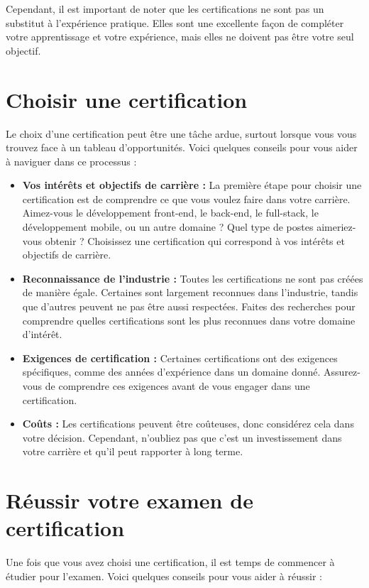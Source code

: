 Cependant, il est important de noter que les certifications ne sont pas un substitut à l'expérience pratique. Elles sont une excellente façon de compléter votre apprentissage et votre expérience, mais elles ne doivent pas être votre seul objectif.

\section{Choisir une certification}

Le choix d'une certification peut être une tâche ardue, surtout lorsque vous vous trouvez face à un tableau d'opportunités. Voici quelques conseils pour vous aider à naviguer dans ce processus :

\begin{itemize}
    \item \textbf{Vos intérêts et objectifs de carrière :} La première étape pour choisir une certification est de comprendre ce que vous voulez faire dans votre carrière. Aimez-vous le développement front-end, le back-end, le full-stack, le développement mobile, ou un autre domaine ? Quel type de postes aimeriez-vous obtenir ? Choisissez une certification qui correspond à vos intérêts et objectifs de carrière.
    \item \textbf{Reconnaissance de l'industrie :} Toutes les certifications ne sont pas créées de manière égale. Certaines sont largement reconnues dans l'industrie, tandis que d'autres peuvent ne pas être aussi respectées. Faites des recherches pour comprendre quelles certifications sont les plus reconnues dans votre domaine d'intérêt.
    \item \textbf{Exigences de certification :} Certaines certifications ont des exigences spécifiques, comme des années d'expérience dans un domaine donné. Assurez-vous de comprendre ces exigences avant de vous engager dans une certification.
    \item \textbf{Coûts :} Les certifications peuvent être coûteuses, donc considérez cela dans votre décision. Cependant, n'oubliez pas que c'est un investissement dans votre carrière et qu'il peut rapporter à long terme.
\end{itemize}

\section{Réussir votre examen de certification}

Une fois que vous avez choisi une certification, il est temps de commencer à étudier pour l'examen. Voici quelques conseils pour vous aider à réussir :

